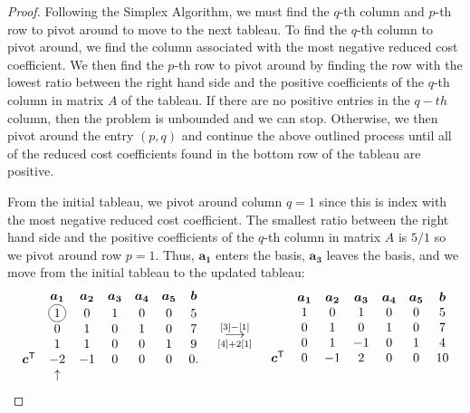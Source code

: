 \documentclass[12pt]{article}
\newcommand*\circled[1]{\tikz[baseline=(char.base)]{
            \node[shape=circle,draw,inner sep=2pt] (char) {#1};}}
\theoremstyle{definition}
\newcommand{\vect}[1]{\boldsymbol{#1}}
\newcommand{\grstep}[2][\relax]{%
   \ensuremath{\mathrel{
       {\mathop{\longrightarrow}\limits^{#2\mathstrut}_{
                                     \begin{subarray}{l} #1 \end{subarray}}}}}}
\newcommand{\tran}{\mathsf{T}}
\begin{document}
\begin{proof}
  Following the Simplex Algorithm, we must find the $q$-th column and $p$-th row to pivot around
  to move to the next tableau. To find the $q$-th column to pivot around, we find the column associated with
  the most negative reduced cost coefficient. We then find the $p$-th row to pivot
  around by finding the row with the lowest ratio between the right hand side and
  the positive coefficients of the $q$-th column in matrix $A$ of the tableau.
  If there are no positive entries in the $q-th$ column, then the problem is
  unbounded and we can stop. Otherwise, we then pivot
  around the entry $(p, q)$ and continue the above outlined process until all of the reduced
  cost coefficients found in the bottom row of the tableau are positive.

  From the initial tableau, we pivot around column
  $q=1$ since this is index with the most negative reduced cost coefficient.
  The smallest ratio between the right hand side and the positive coefficients
  of the $q$-th column in matrix $A$ is $5/1$ so we pivot around row $p=1$. Thus, $\vect{a_1}$
  enters the basis, $\vect{a_3}$ leaves the basis, and we move from the initial tableau to the updated tableau:
  \begin{align*}
    \begin{matrix}
      & \vect{a_1} & \vect{a_2} & \vect{a_3} & \vect{a_4} & \vect{a_5} & \vect{b} \\
      & \circled{1} & 0 & 1 & 0 & 0 & 5 \\
      & 0 & 1 & 0 & 1 & 0 & 7 \\
      & 1 & 1 & 0 & 0 & 1 & 9 \\
      \vect{c}^\tran & -2 & -1 & 0 & 0 & 0 & 0. \\
      & \uparrow & & & & & \\
    \end{matrix}
    \quad
    \begin{array}{c}
    \grstep[{[4] + 2[1]}]{[3] - [1]} \\
    \end{array}
    \quad
    \begin{matrix}
      & \vect{a_1} & \vect{a_2} & \vect{a_3} & \vect{a_4} & \vect{a_5} & \vect{b} \\
                       & 1 & 0 & 1 & 0 & 0 & 5 \\
                       & 0 & 1 & 0 & 1 & 0 & 7 \\
                       & 0 & 1 & -1 & 0 & 1 & 4 \\
      \vect{c}^\tran & 0 & -1 & 2 & 0 & 0 & 10 \\
      & & & & & & \\
    \end{matrix}
  \end{align*}


\end{proof}
\end{document}
